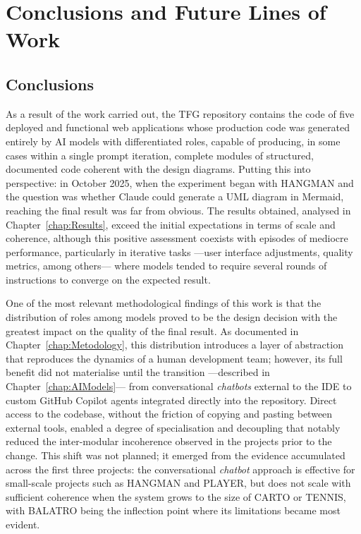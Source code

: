 
\chapter{Conclusions and Future Lines of Work} \label{chap:Conclusions}

\section{Conclusions} \label{sec:conclusions}

As a result of the work carried out, the \ac{TFG} repository \cite{URL::TFG} contains the code of five deployed and functional web applications whose production code was generated entirely by \ac{AI} models with differentiated roles, capable of producing, in some cases within a single prompt iteration, complete modules of structured, documented code coherent with the design diagrams. Putting this into perspective: in October 2025, when the experiment began with \ac{HANGMAN} and the question was whether Claude could generate a UML diagram in Mermaid, reaching the final result was far from obvious. The results obtained, analysed in Chapter~\ref{chap:Results}, exceed the initial expectations in terms of scale and coherence, although this positive assessment coexists with episodes of mediocre performance, particularly in iterative tasks ---user interface adjustments, quality metrics, among others--- where models tended to require several rounds of instructions to converge on the expected result.

One of the most relevant methodological findings of this work is that the distribution of roles among models proved to be the design decision with the greatest impact on the quality of the final result. As documented in Chapter~\ref{chap:Metodology}, this distribution introduces a layer of abstraction that reproduces the dynamics of a human development team; however, its full benefit did not materialise until the transition ---described in Chapter~\ref{chap:AIModels}--- from conversational \textit{chatbots} external to the \ac{IDE} to custom GitHub Copilot agents integrated directly into the repository. Direct access to the codebase, without the friction of copying and pasting between external tools, enabled a degree of specialisation and decoupling that notably reduced the inter-modular incoherence observed in the projects prior to the change. This shift was not planned; it emerged from the evidence accumulated across the first three projects: the conversational \textit{chatbot} approach is effective for small-scale projects such as \ac{HANGMAN} and \ac{PLAYER}, but does not scale with sufficient coherence when the system grows to the size of \ac{CARTO} or \ac{TENNIS}, with \ac{BALATRO} being the inflection point where its limitations became most evident.


